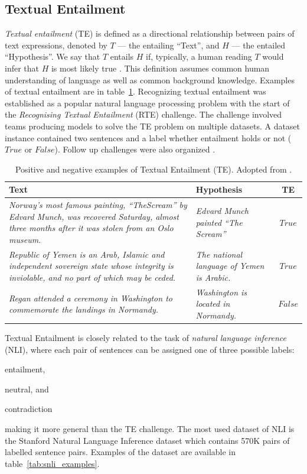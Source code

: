 \subsection{Textual Entailment}
\label{sec:textual_entailment}

\textit{Textual entailment} (TE) is defined as a directional relationship
between pairs of text expressions, denoted by $T$ --- the entailing ``Text'',
and $H$ --- the entailed ``Hypothesis''. We say that $T$ entails $H$ if,
typically, a human reading $T$ would infer that $H$ is most likely true 
\citep{dagan2005pascal}.  This definition assumes common human understanding of
language as well as common background knowledge. Examples of textual entailment
are in
table~\ref{tab:te_examples}.  
Recognizing textual entailment was established as
a popular natural language processing problem with the start of the
\textit{Recognising Textual Entailment} (RTE) challenge. The challenge involved
teams producing models to solve the TE problem on multiple datasets. A dataset
instance contained two sentences and a label whether entailment holds or not
($\mathit{True}$ or $\mathit{False}$).
Follow up challenges were also organized \citep{bar2006second, giampiccolo2007third}.

\begin{table}
	\centering
	\begin{tabular}{p{8cm} | p{5cm} | c}
		Text & Hypothesis & TE \\
		\toprule
		\textit{
		Norway’s most famous painting, ``TheScream'' by Edvard Munch, was recovered
		Saturday, almost three months after it was stolen from an Oslo
		museum.} & 
		\textit{Edvard   Munch   painted ``The Scream''  }
		& $\mathit{True}$ \\
		\textit{Republic of Yemen is an Arab, Islamic and independent
		sovereign state whose integrity is inviolable,  and  no part
		of which may be ceded.} & 
		\textit{The national language of Yemen is Arabic.}
		& $\mathit{True}$ \\
		\textit{Regan attended a ceremony in Washington to commemorate the
		landings in Normandy.} &
		\textit{Washington is located in Normandy. } & $\mathit{False}$ \\
		\bottomrule
	\end{tabular}
	\caption{Positive and negative examples of Textual Entailment (TE).
	Adopted from \citep{dagan2005pascal}.}
	\label{tab:te_examples}
\end{table}

Textual Entailment is closely related to the task of \textit{natural language inference} (NLI), 
where each pair of sentences can be assigned one of three possible labels:
\begin{enumerate*}
	\item entailment, 
	\item neutral, and
	\item contradiction
\end{enumerate*} 
making it more general than the TE challenge. 
The most used dataset of NLI is the Stanford Natural Language Inference dataset
\citep{bowman2015large} which contains 570K pairs of labelled sentence pairs. 
Examples of the dataset are available in table~\ref{tab:snli_examples}.

